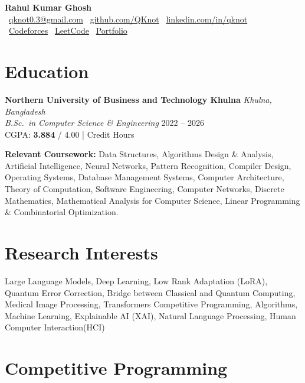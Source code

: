\documentclass[a4paper,11pt]{article}
\newcommand{\cventry}[5]{%
  \textbf{#1} \hfill \textit{#2} \\
  \textit{#3} \hfill #4 \\
  #5 \par\vspace{4pt}
}
\begin{document}
\begin{center}
  {\LARGE\bfseries\color{headerblue} Rahul Kumar Ghosh} \\[6pt]
  {\color{darkgray}
    \faEnvelope\ \href{mailto:qknot0.3@gmail.com}{qknot0.3@gmail.com} \quad
    \faGithub\ \href{https://github.com/QKnot}{github.com/QKnot} \quad
    \faLinkedin\ \href{https://www.linkedin.com/in/qknot}{linkedin.com/in/qknot}
  } \\[3pt]
  {\color{lightgray}
    \faCode\ \href{https://codeforces.com/profile/qknot}{Codeforces} \quad
    \faCode\ \href{https://leetcode.com/QKnot}{LeetCode} \quad
    \faGlobe\ \href{https://qknot.github.io/Portfolio/}{Portfolio}
  }
\end{center}

\section{Education}

\cventry
  {Northern University of Business and Technology Khulna}
  {Khulna, Bangladesh}
  {B.Sc.\ in Computer Science \& Engineering}
  {2022 -- 2026}
  {CGPA: \textbf{3.884} / 4.00 \quad|\quad 152 Credit Hours}

\textbf{Relevant Coursework:}
Data Structures, Algorithms Design \& Analysis, Artificial Intelligence, 
Neural Networks, Pattern Recognition, Compiler Design, Operating Systems, 
Database Management Systems, Computer Architecture, Theory of Computation,
Software Engineering, Computer Networks, Discrete Mathematics, 
Mathematical Analysis for Computer Science, Linear Programming \& 
Combinatorial Optimization.

\section{Research Interests}

Large Language Models, Deep Learning, Low Rank Adaptation (LoRA), Quantum Error Correction, Bridge between Classical and Quantum Computing, 
Medical Image Processing, Transformers Competitive Programming, Algorithms, Machine Learning, Explainable AI (XAI), Natural Language Processing, Human Computer Interaction(HCI)
\section{Competitive Programming}
\end{document}
